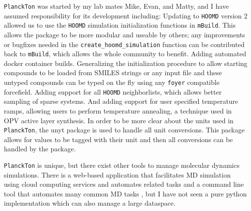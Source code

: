 \texttt{PlanckTon} was started by my lab mates Mike, Evan, and Matty, and I have assumed responsibility for its development including:
Updating to \texttt{HOOMD} version 2 allowed us to use the \texttt{HOOMD} simulation initialization functions in \texttt{mBuild}. This allows the package to be more modular and useable by others; any improvements or bugfixes needed in the \lstinline{create_hoomd_simulation} function can be contributed back to \texttt{mBuild}, which allows the whole community to benefit.
Adding automated docker container builds.
Generalizing the initialization procedure to allow starting compounds to be loaded from SMILES strings or any input file and these untyped compounds can be typed on the fly using any \texttt{foyer} compatible forcefield.
Adding support for all \texttt{HOOMD} neighborlists, which allows better sampling of sparse systems. 
And adding support for user specified temperature ramps, allowing users to perform temperature annealing, a technique used in OPV active layer synthesis.
In order to be more clear about the units used in \texttt{PlanckTon}, the unyt package is used to handle all unit conversions. This package allows for values to be tagged with their unit and then all conversions can be handled by the package.

\texttt{PlanckTon} is unique, but there exist other tools to manage molecular dynamics simulations. There is a web-based application that facilitates MD simulation using cloud computing services and automates related tasks \citep{Nicolas-Barreales2021} and a command line tool that automates many common MD tasks \citep{Rackers2018}, but I have not seen a pure python implementation which can also manage a large dataspace.

